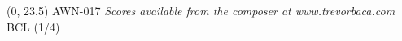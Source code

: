 \documentclass[11pt]{report}
\begin{document}
\begin{textblock}{23}(0, 23.5)
AWN-017 \hfill
\textit{Scores available from the composer at www.trevorbaca.com} \hfill
BCL (1/4)
\end{textblock}
\end{document}
